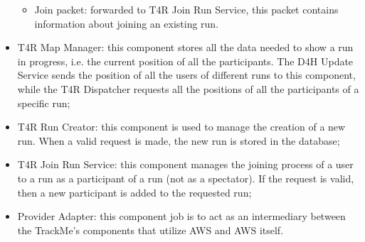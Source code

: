 \begin{itemize}
\begin{itemize}
\item Join packet: forwarded to T4R Join Run Service, this packet contains information about joining an existing run.
\end{itemize}
\item T4R Map Manager: this component stores all the data needed to show a run in progress, i.e. the current position of all the participants. The D4H Update Service sends the position of all the users of different runs to this component, while the T4R Dispatcher requests all the positions of all the participants of a specific run;
\item T4R Run Creator: this component is used to manage the creation of a new run. When a valid request is made, the new run is stored in the database;
\item T4R Join Run Service: this component manages the joining process of a user to a run as a participant of a run (not as a spectator). If the request is valid, then a new participant is added to the requested run;
\item Provider Adapter: this component job is to act as an intermediary between the TrackMe's components that utilize AWS and AWS itself.
\end{itemize}